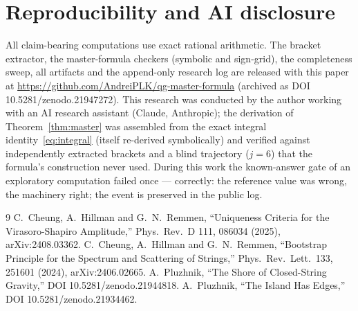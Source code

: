 \documentclass[11pt]{article}
\begin{document}
\section*{Reproducibility and AI disclosure}
All claim-bearing computations use exact rational arithmetic. The bracket
extractor, the master-formula checkers (symbolic and sign-grid), the
completeness sweep, all artifacts and the append-only research log are
released with this paper at \url{https://github.com/AndreiPLK/qg-master-formula}
(archived as DOI 10.5281/zenodo.21947272). This research was conducted by the author working
with an AI research assistant (Claude, Anthropic); the derivation of
Theorem~\ref{thm:master} was assembled from the exact integral
identity~\eqref{eq:integral} (itself re-derived symbolically) and verified
against independently extracted brackets and a blind trajectory ($j{=}6$)
that the formula's construction never used. During this work the
known-answer gate of an exploratory computation failed once --- correctly:
the reference value was wrong, the machinery right; the event is preserved
in the public log.

\begin{thebibliography}{9}
 C.~Cheung, A.~Hillman and G.~N.~Remmen,
``Uniqueness Criteria for the Virasoro-Shapiro Amplitude,''
Phys.\ Rev.\ D 111, 086034 (2025), arXiv:2408.03362.
 C.~Cheung, A.~Hillman and G.~N.~Remmen,
``Bootstrap Principle for the Spectrum and Scattering of Strings,''
Phys.\ Rev.\ Lett.\ 133, 251601 (2024), arXiv:2406.02665.
 A.~Pluzhnik, ``The Shore of Closed-String Gravity,''
DOI 10.5281/zenodo.21944818.
 A.~Pluzhnik, ``The Island Has Edges,''
DOI 10.5281/zenodo.21934462.
\end{thebibliography}
\end{document}
